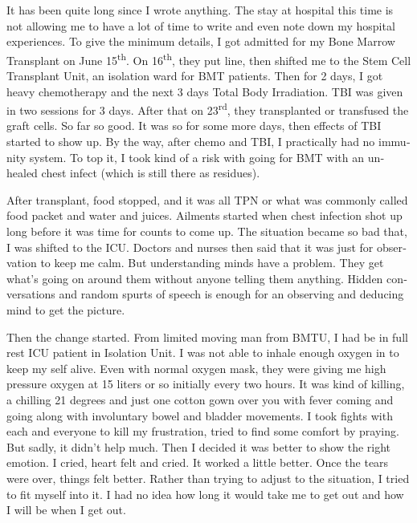 \vskip 2pt
\begin{english}

It has been quite long since I wrote anything. The stay at hospital this time is not allowing me to have a lot of time to write and even note down my hospital experiences. To give the minimum details, I got admitted for my Bone Marrow Transplant on June 15\textsuperscript{th}. On 16\textsuperscript{th}, they put line, then shifted me to the Stem Cell Transplant Unit, an isolation ward for BMT patients. Then for 2 days, I got heavy chemotherapy and the next 3 days Total Body Irradiation. TBI was given in two sessions for 3 days. After that on 23\textsuperscript{rd}, they transplanted or transfused the graft cells. So far so good. It was so for some more days, then effects of TBI started to show up. By the way, after chemo and TBI, I practically had no immunity system. To top it, I took kind of a risk with going for BMT with an unhealed chest infect (which is still there as residues). 

After transplant, food stopped, and it was all TPN or what was commonly called food packet and water and juices. Ailments started when chest infection shot up long before it was time for counts to come up. The situation became so bad that, I was shifted to the ICU. Doctors and nurses then said that it was just for observation to keep me calm. But understanding minds have a problem. They get what's going on around them without anyone telling them anything. Hidden conversations and random spurts of speech is enough for an observing and deducing mind to get the picture. 

Then the change started. From limited moving man from BMTU, I had be in full rest ICU patient in Isolation Unit. I was not able to inhale enough oxygen in to keep my self alive. Even with normal oxygen mask, they were giving me high pressure oxygen at 15 liters or so initially every two hours. It was kind of killing, a chilling 21 degrees and just one cotton gown over you with fever coming and going along with involuntary bowel and bladder movements. I took fights with each and everyone to kill my frustration, tried to find some comfort by praying. But sadly, it didn't help much. Then I decided it was better to show the right emotion. I cried, heart felt and cried. It worked a little better. Once the tears were over, things felt better. Rather than trying to adjust to the situation, I tried to fit myself into it. I had no idea how long it would take me to get out and how I will be when I get out. 


\end{english}
